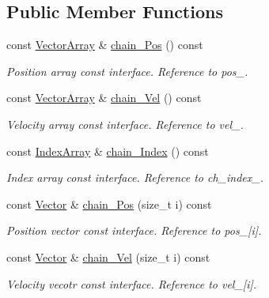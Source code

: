 \subsection*{Public Member Functions}
\begin{DoxyCompactItemize}
\item 
const \mbox{\hyperlink{class_vel_indep_particles_a27580f65b6523bfb6900520af2e44708}{Vector\+Array}} \& \mbox{\hyperlink{class_vel_indep_chain_particles_a77765235a45fd13ce74d69d1a1db1770}{chain_\+Pos}} () const
\begin{DoxyCompactList}\small\item\em Position array const interface. Reference to pos\+\_\+. \end{DoxyCompactList}\item 
const \mbox{\hyperlink{class_vel_indep_particles_a27580f65b6523bfb6900520af2e44708}{Vector\+Array}} \& \mbox{\hyperlink{class_vel_indep_chain_particles_a22672cce6930aec1555f1f0662d0f52a}{chain_\+Vel}} () const
\begin{DoxyCompactList}\small\item\em Velocity array const interface. Reference to vel\+\_\+. \end{DoxyCompactList}\item 
const \mbox{\hyperlink{class_vel_indep_chain_particles_a691749351fb710d16619ef6cc43bb1e6}{Index\+Array}} \& \mbox{\hyperlink{class_vel_indep_chain_particles_a0ad298c834406f31f95df62694d51869}{chain_\+Index}} () const
\begin{DoxyCompactList}\small\item\em Index array const interface. Reference to ch\+\_\+index\+\_\+. \end{DoxyCompactList}\item 
const \mbox{\hyperlink{class_vel_indep_particles_aa7e03da81f44941c06abf43ec2180079}{Vector}} \& \mbox{\hyperlink{class_vel_indep_chain_particles_a245e69b858810e26e5ed61746694382e}{chain_\+Pos}} (size\+\_\+t i) const
\begin{DoxyCompactList}\small\item\em Position vector const interface. Reference to pos\+\_\+\mbox{[}i\mbox{]}. \end{DoxyCompactList}\item 
const \mbox{\hyperlink{class_vel_indep_particles_aa7e03da81f44941c06abf43ec2180079}{Vector}} \& \mbox{\hyperlink{class_vel_indep_chain_particles_a81b2a3bd3f972dd11486beaafa6efc72}{chain_\+Vel}} (size\+\_\+t i) const
\begin{DoxyCompactList}\small\item\em Velocity vecotr const interface. Reference to vel\+\_\+\mbox{[}i\mbox{]}. \end{DoxyCompactList}\item 

\end{DoxyCompactItemize}
